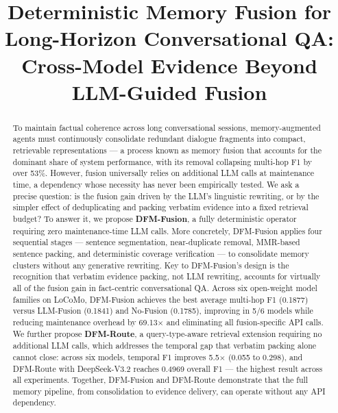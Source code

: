 \documentclass{article} %
\title{Deterministic Memory Fusion for Long-Horizon Conversational QA: Cross-Model Evidence Beyond LLM-Guided Fusion}
\author{}
\theoremstyle{plain}
\theoremstyle{definition}
\theoremstyle{remark}
\begin{document}
\maketitle

\begin{abstract}
To maintain factual coherence across long conversational sessions, memory-augmented agents must continuously consolidate redundant dialogue fragments into compact, retrievable representations --- a process known as memory fusion that accounts for the dominant share of system performance, with its removal collapsing multi-hop F1 by over 53\%. However, fusion universally relies on additional LLM calls at maintenance time, a dependency whose necessity has never been empirically tested. We ask a precise question: is the fusion gain driven by the LLM's linguistic rewriting, or by the simpler effect of deduplicating and packing verbatim evidence into a fixed retrieval budget? To answer it, we propose \textbf{DFM-Fusion}, a fully deterministic operator requiring zero maintenance-time LLM calls. More concretely, DFM-Fusion applies four sequential stages --- sentence segmentation, near-duplicate removal, MMR-based sentence packing, and deterministic coverage verification --- to consolidate memory clusters without any generative rewriting. Key to DFM-Fusion's design is the recognition that verbatim evidence packing, not LLM rewriting, accounts for virtually all of the fusion gain in fact-centric conversational QA. Across six open-weight model families on LoCoMo, DFM-Fusion achieves the best average multi-hop F1 (0.1877) versus LLM-Fusion (0.1841) and No-Fusion (0.1785), improving in 5/6 models while reducing maintenance overhead by 69.13$\times$ and eliminating all fusion-specific API calls. We further propose \textbf{DFM-Route}, a query-type-aware retrieval extension requiring no additional LLM calls, which addresses the temporal gap that verbatim packing alone cannot close: across six models, temporal F1 improves 5.5$\times$ (0.055 to 0.298), and DFM-Route with DeepSeek-V3.2 reaches 0.4969 overall F1 --- the highest result across all experiments. Together, DFM-Fusion and DFM-Route demonstrate that the full memory pipeline, from consolidation to evidence delivery, can operate without any API dependency.
\end{abstract}













\appendix




\end{document}

